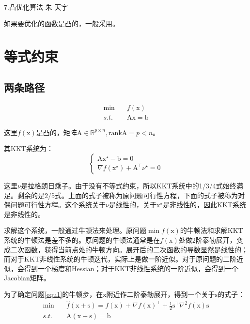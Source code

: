 \documentclass[a4paper]{D:/MyRepo/Script/latex/PaperReadingLog}
\begin{document}
\PaperInfo
{7.凸优化算法}
{朱}
{天宇}
{}

如果要优化的函数是凸的，一般采用。

\section{等式约束}

\subsection{两条路径}

\begin{equation}
    \label{equ1}
    \begin{aligned}
        \min\quad &f(\mathrm{x})\\
        s.t.\quad &\mathrm{A}\mathrm{x}=\mathrm{b}
    \end{aligned}
\end{equation}

这里$f(\mathrm{x})$是凸的，矩阵$\mathrm{A}\in\mathbb{R}^{p\times n},\mathrm{rankA}=p<n$。

其KKT系统为：
\begin{equation}
    \label{equ3}
    \left\{
        \begin{aligned}
            \mathrm{A}\mathrm{x}^\star-\mathrm{b}=0\\
            \nabla f(\mathrm{x}^\star)+\mathrm{A}^\top\nu^\star=0
        \end{aligned}
        \right.        
\end{equation}

这里$\nu$是拉格朗日乘子。由于没有不等式约束，所以KKT系统中的1/3/4式始终满足。剩余的是2/5式。上面的式子被称为原问题可行性方程，下面的式子被称为对偶问题可行性方程。这个系统关于$\nu$是线性的，关于$\mathrm{x}^\star$是非线性的，因此KKT系统是非线性的。

求解这个系统，一般通过牛顿法来处理。原问题$\min f(\mathrm{x})$的牛顿法和求解KKT系统的牛顿法是差不多的。原问题的牛顿法通常是在$f(\mathrm{x})$处做2阶泰勒展开，变成二次函数，获得当前点处的牛顿方向。展开后的二次函数的导数显然是线性的；而对于KKT非线性系统的牛顿迭代，实际上是做一阶近似。对于原问题的二阶近似，会得到一个梯度和Hessian；对于KKT非线性系统的一阶近似，会得到一个Jacobian矩阵。

为了确定问题\ref{equ1}的牛顿步，在$\mathrm{x}$附近作二阶泰勒展开，得到一个关于$\mathrm{s}$的式子：
\begin{equation}
    \label{equ2}
    \begin{aligned}
        \min\quad&\hat{f}(\mathrm{x}+\mathrm{s})=f(\mathrm{x})+\nabla f(\mathrm{x})^\top +\frac{1}{2}\mathrm{s}^\top \nabla^2f(\mathrm{x})\mathrm{s}\\
        s.t.\quad&\mathrm{A}(\mathrm{x}+\mathrm{s})=\mathrm{b}
    \end{aligned}        
\end{equation}
\end{document}
